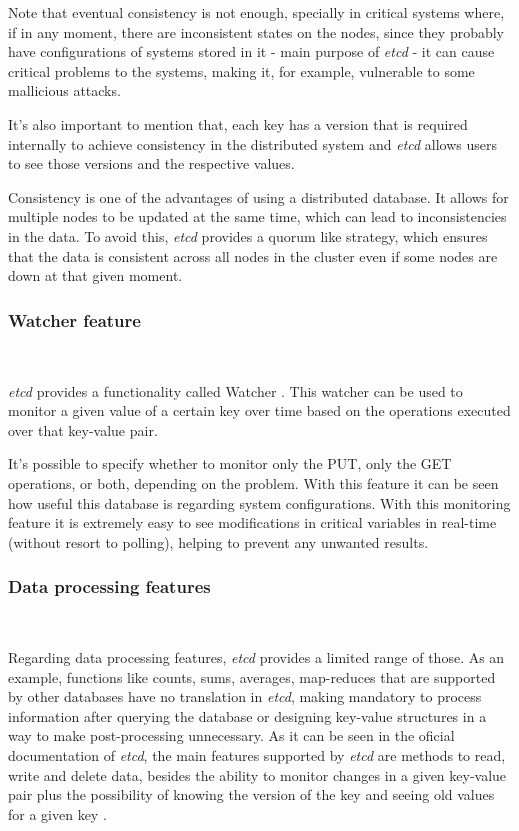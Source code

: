 \documentclass[screen,review]{acmart}
\begin{document}
Note that eventual consistency is not enough, specially in critical systems where, if in any moment, there are inconsistent states on the nodes, since they probably have configurations of systems stored in it - main purpose of \textit{etcd} - it can cause critical problems to the systems, making it, for example, vulnerable to some mallicious attacks.

It's also important to mention that, each key has a version that is required internally to achieve consistency in the distributed system and \textit{etcd} allows users to see those versions and the respective values.

Consistency is one of the advantages of using a distributed database. It allows for multiple nodes to be updated at the same time, which can lead to inconsistencies in the data. To avoid this, \textit{etcd} provides a quorum like strategy, which ensures that the data is consistent across all nodes in the cluster even if some nodes are down at that given moment\cite{etcd_api}. \\

\subsubsection{Watcher feature}~\

\textit{etcd} provides a functionality called Watcher \cite{etcd_watcher}. This watcher can be used to monitor a given value of a certain key over time based on the operations executed over that key-value pair.

It's possible to specify whether to monitor only the PUT, only the GET operations, or both, depending on the problem.
With this feature it can be seen how useful this database is regarding system configurations. With this monitoring feature it is extremely easy to see modifications in critical variables in real-time (without resort to polling), helping to prevent any unwanted results. \\

\subsubsection{Data processing features}~\

Regarding data processing features, \textit{etcd} provides a limited range of those. As an example, functions like counts, sums, averages, map-reduces that are supported by other databases have no translation in \textit{etcd}, making mandatory to process information after querying the database or designing key-value structures in a way to make post-processing unnecessary.
As it can be seen in the oficial documentation of \textit{etcd}, the main features supported by \textit{etcd} are methods to read, write and delete data, besides the ability to monitor changes in a given key-value pair plus the possibility of knowing the version of the key and seeing old values for a given key \cite{etcd_interacting} \cite{etcd_api}.
\end{document}
